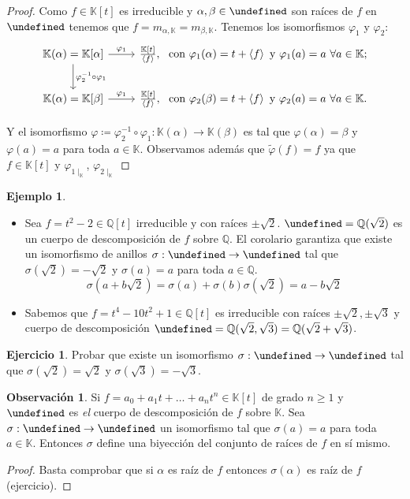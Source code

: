 \documentclass[10pt, spanish]{report}
\theoremstyle{definition}
\newtheorem*{ej}{Ejemplo}
\newtheorem*{ejer}{Ejercicio}
\newtheorem*{obs}{Observación}
\newcommand{\Q}{\mathbb{Q}}
\newcommand{\K}{\mathbb{K}}
\let\L\undefined
\newcommand{\L}{\mathbb{L}}
\renewcommand{\geq}{\geqslant}
\newcommand{\completar}{\fbox{\textbf{¡Completar!}}}
\begin{document}
\begin{proof}
    Como $f\in\K[t]$ es irreducible y $\alpha,\beta\in\L$ son raíces de $f$ en
    $\L$ tenemos que $f=m_{\alpha,\K}=m_{\beta,\K}$. Tenemos los isomorfismos
    $\varphi_1$ y $\varphi_2$:  
    \[\begin{tikzcd}
        \K(\alpha)=\K[\alpha]\arrow{d}{\varphi_2^{-1}\circ\varphi_1}
        \arrow{r}{\varphi_1}&\frac{\K[t]}{\left<f\right>},\ 
        \text{ con }\varphi_1(\alpha)=t+\left<f\right>
        \text{ y }\varphi_1(a)=a\ \forall a\in\K;
        \\
        \K(\alpha)=\K[\beta] \arrow{r}{\varphi_1}&\frac{\K[t]}{\left<f\right>},\ 
        \text{ con }\varphi_2(\beta)=t+\left<f\right>
        \text{ y }\varphi_2(a)=a\ \forall a\in\K.
    \end{tikzcd}\]

    Y el isomorfismo $\varphi\coloneqq\varphi_2^{-1}\circ\varphi_1:\K(\alpha)\to
    \K(\beta)$ es tal que $\varphi(\alpha)=\beta$ y $\varphi(a)=a$ para toda
    $a\in\K$. Observamos además que $\tilde{\varphi}(f)=f$ ya que $f\in\K[t]$ y
    $\varphi_{1\mid_\K}$, $\varphi_{2\mid_\K}$ 

    \completar

\end{proof}

\begin{ej}
    \begin{itemize}
        \item Sea $f=t^2-2\in\Q[t]$ irreducible y con raíces $\pm\sqrt{2}$.
            $\L=\Q(\sqrt{2})$ es un cuerpo de descomposición de $f$ sobre $\Q$.
            El corolario garantiza que existe un isomorfismo de anillos $\sigma:
            \L\to\L$ tal que $\sigma(\sqrt{2})=-\sqrt{2}$ y $\sigma(a)=a$ para
            toda $a\in\Q$. \[\sigma(a+b\sqrt{2})=\sigma(a)+\sigma(b)
            \sigma(\sqrt{2})=a-b\sqrt{2}\] 
        \item Sabemos que $f=t^4-10t^2+1\in\Q[t]$ es irreducible con raíces
            $\pm\sqrt{2},\pm\sqrt{3}$ y cuerpo de descomposición
            $\L=\Q(\sqrt{2}, \sqrt{3})=\Q(\sqrt{2}+\sqrt{3})$.  
    \end{itemize}
\end{ej}

\begin{ejer}
    Probar que existe un isomorfismo $\sigma:\L\to\L$ tal que
    $\sigma(\sqrt{2})=\sqrt{2}$ y $\sigma(\sqrt{3})=-\sqrt{3}$.
\end{ejer}

\begin{obs}
    Si $f=a_0+a_1t+\ldots+a_nt^n\in\K[t]$ de grado $n\geq1$ y $\L$ es
    \textit{el} cuerpo de descomposición de $f$ sobre $\K$. Sea $\sigma:\L\to\L$
    un isomorfismo tal que $\sigma(a)=a$ para toda $a\in\K$. Entonces $\sigma$
    define una biyección del conjunto de raíces de $f$ en sí mismo.
\end{obs}
\begin{proof}
    Basta comprobar que si $\alpha$ es raíz de $f$ entonces $\sigma(\alpha)$ es
    raíz de $f$ (ejercicio).
\end{proof}
\end{document}
